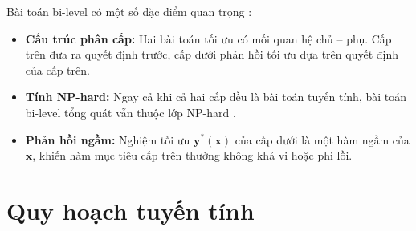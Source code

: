 Bài toán bi-level có một số đặc điểm quan trọng \cite{sinha2018bilevel_review}:

\begin{itemize}
    \item \textbf{Cấu trúc phân cấp:} Hai bài toán tối ưu có mối quan hệ chủ -- phụ. Cấp trên đưa ra quyết định trước, cấp dưới phản hồi tối ưu dựa trên quyết định của cấp trên.
    
    \item \textbf{Tính NP-hard:} Ngay cả khi cả hai cấp đều là bài toán tuyến tính, bài toán bi-level tổng quát vẫn thuộc lớp NP-hard \cite{hansen1992bilevel_nphard}.
    
    \item \textbf{Phản hồi ngầm:} Nghiệm tối ưu $\mathbf{y}^*(\mathbf{x})$ của cấp dưới là một hàm ngầm của $\mathbf{x}$, khiến hàm mục tiêu cấp trên thường không khả vi hoặc phi lồi.
\end{itemize}

\section{Quy hoạch tuyến tính}

